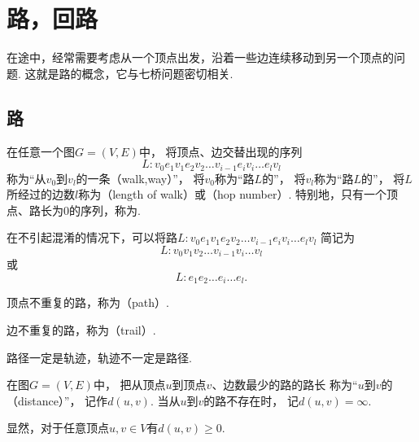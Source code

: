 \section{路，回路}
在途中，经常需要考虑从一个顶点出发，沿着一些边连续移动到另一个顶点的问题.
这就是路的概念，它与七桥问题密切相关.

\subsection{路}
\begin{definition}
在任意一个图\(G = (V,E)\)中，
将顶点、边交替出现的序列\[
	L: v_0 e_1 v_1 e_2 v_2 \dotso v_{i-1} e_i v_i \dotso e_l v_l
\]称为“从\(v_0\)到\(v_l\)的一条（walk,way）”，
将\(v_0\)称为“路\(L\)的”，
将\(v_l\)称为“路\(L\)的”，
将\(L\)所经过的边数\(l\)称为（length of walk）或（hop number）.
特别地，只有一个顶点、路长为\(0\)的序列，称为.
\end{definition}

在不引起混淆的情况下，可以将路\(L: v_0 e_1 v_1 e_2 v_2 \dotso v_{i-1} e_i v_i \dotso e_l v_l\)
简记为\[
	L: v_0 v_1 v_2 \dotso v_{i-1} v_i \dotso v_l
\]
或\[
	L: e_1 e_2 \dotso e_i \dotso e_l.
\]

\begin{definition}
顶点不重复的路，称为（path）.
\end{definition}

\begin{definition}
边不重复的路，称为（trail）.
\end{definition}

\begin{proposition}
路径一定是轨迹，轨迹不一定是路径.
\end{proposition}

\begin{definition}
在图\(G = (V,E)\)中，
把从顶点\(u\)到顶点\(v\)、边数最少的路的路长
称为“\(u\)到\(v\)的（distance）”，
记作\(d(u,v)\).
当从\(u\)到\(v\)的路不存在时，
记\(d(u,v) = \infty\).
\end{definition}

显然，对于任意顶点\(u,v \in V\)有\(d(u,v) \geq 0\).

